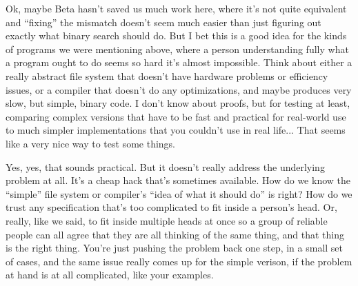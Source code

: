 \documentclass[sigplan]{acmart}
\begin{document}
\vspace{0.1in}
\vspace{0.1in}

  Ok, maybe Beta hasn't saved us much
work here, where it's not quite equivalent and ``fixing'' the mismatch
doesn't seem much easier than just figuring out exactly what binary
search should do.  But I bet this is a good idea for the kinds of
programs we were mentioning above, where a person understanding fully
what a program ought to do seems so hard it's almost impossible.
Think about either a really abstract file system that doesn't have
hardware problems or efficiency issues, or a compiler that doesn't do
any optimizations, and maybe produces very slow, but simple, binary
code.  I don't know about proofs, but for testing at least, comparing
complex versions that have to be fast and practical for real-world use
to much simpler implementations that you couldn't use in real life...
That seems like a very nice way to test some things.

  Yes, yes, that sounds practical.  But it
doesn't really address the underlying problem at all.  It's a cheap
hack that's sometimes available. How do we know the ``simple''
file system or compiler's ``idea of what it should do'' is right?  How
do we trust any specification that's too complicated to fit inside a
person's head.  Or, really, like we said, to fit inside multiple heads
at once so a group of reliable people can all agree that they are all
thinking of the same thing, and that thing is the right thing.  You're
just pushing the problem back one step, in a small set of cases, and
the same issue really comes up for the simple verison, if the problem
at hand is at all complicated, like your examples.
\end{document}
